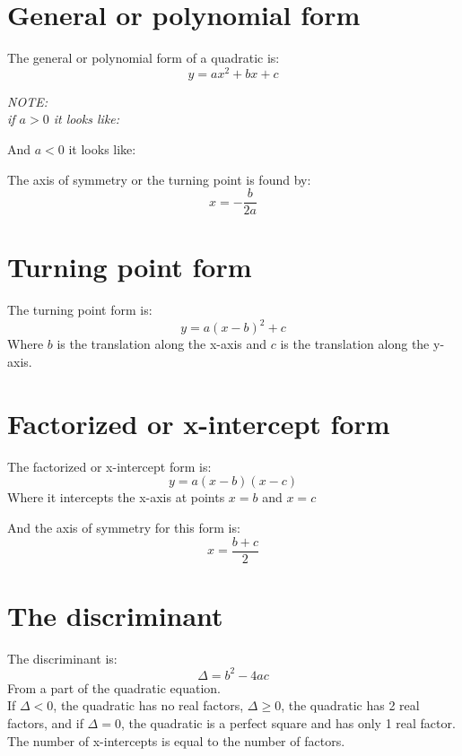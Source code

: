 \documentclass{book}
\newenvironment{note}{\begin{center}\em NOTE:\\}{\end{center}}
\begin{document}
\section{General or polynomial form}
The general or polynomial form of a quadratic is:
\[
	y = ax^2 + bx + c
\]
\begin{note}
	if $a > 0$ it looks like:
	\begin{center}
	\end{center}
	And $a < 0$ it looks like:
	\begin{center}
	\end{center}
\end{note}
The axis of symmetry or the turning point is found by:
\[
	x = -\frac{b}{2a}
\]

\section{Turning point form}
The turning point form is:
\[
	y = a(x - b)^2 + c
\]
Where $b$ is the translation along the x-axis and $c$ is the translation along the y-axis.

\section{Factorized or x-intercept form}
The factorized or x-intercept form is:
\[
	y = a(x - b)(x - c)
\]
Where it intercepts the x-axis at points $x = b$ and $x = c$

And the axis of symmetry for this form is:
\[
	x = \frac{b + c}{2}
\]

\section{The discriminant}
The discriminant is:
\[
	\Delta = b^2 - 4ac
\]
From a part of the quadratic equation.\\
If $\Delta < 0$, the quadratic has no real factors, $\Delta \geq 0$, the quadratic has 2 real factors, and if $\Delta = 0$, the quadratic is a perfect square and has only 1 real factor.  The number of x-intercepts is equal to the number of factors.
\end{document}
